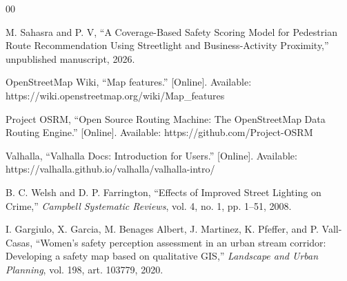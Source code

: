 \documentclass[conference]{IEEEtran}
\begin{document}
\begin{thebibliography}{00}

 M. Sahasra and P. V, ``A Coverage-Based Safety Scoring Model for Pedestrian Route Recommendation Using Streetlight and Business-Activity Proximity,'' unpublished manuscript, 2026.

 OpenStreetMap Wiki, ``Map features.'' [Online]. Available: https://wiki.openstreetmap.org/wiki/Map\_features

 Project OSRM, ``Open Source Routing Machine: The OpenStreetMap Data Routing Engine.'' [Online]. Available: https://github.com/Project-OSRM

 Valhalla, ``Valhalla Docs: Introduction for Users.'' [Online]. Available: https://valhalla.github.io/valhalla/valhalla-intro/

 B. C. Welsh and D. P. Farrington, ``Effects of Improved Street Lighting on Crime,'' \emph{Campbell Systematic Reviews}, vol. 4, no. 1, pp. 1--51, 2008.

 I. Gargiulo, X. Garcia, M. Benages Albert, J. Martinez, K. Pfeffer, and P. Vall-Casas, ``Women's safety perception assessment in an urban stream corridor: Developing a safety map based on qualitative GIS,'' \emph{Landscape and Urban Planning}, vol. 198, art. 103779, 2020.

\end{thebibliography}
\end{document}
